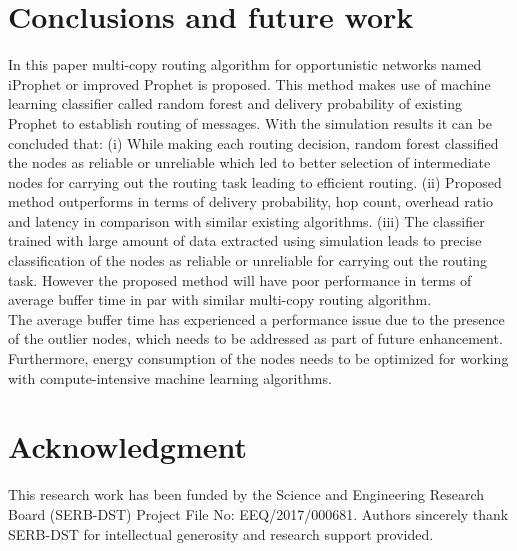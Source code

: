 \documentclass[10pt,journal]{IEEEtran}
\begin{document}
\section{Conclusions and future work}
In this paper multi-copy routing algorithm for opportunistic networks named iProphet or improved Prophet is proposed. This method makes use of machine learning classifier called random forest and delivery probability of existing Prophet to establish routing of messages. With the simulation results it can be concluded that: (i) While making each routing decision, random forest classified the nodes as reliable or unreliable which led to better selection of intermediate nodes for carrying out the routing task leading to efficient routing. (ii) Proposed method outperforms in terms of delivery probability, hop count, overhead ratio and latency in comparison with similar existing algorithms. (iii) The classifier trained with large amount of data extracted using simulation leads to precise classification of the nodes as reliable or unreliable for carrying out the routing task. However the proposed method will have poor performance in terms of average buffer time in par with similar multi-copy routing algorithm. \\
The average buffer time has experienced a performance issue due to the presence of the outlier nodes, which needs to be addressed as part of future enhancement. Furthermore, energy consumption of the nodes needs to be optimized for working with compute-intensive machine learning algorithms. 

\section{Acknowledgment}
This research work has been funded by the Science and Engineering Research Board (SERB-DST) Project File No: EEQ/2017/000681. Authors sincerely thank SERB-DST for intellectual generosity and research support provided.




\end{document}
